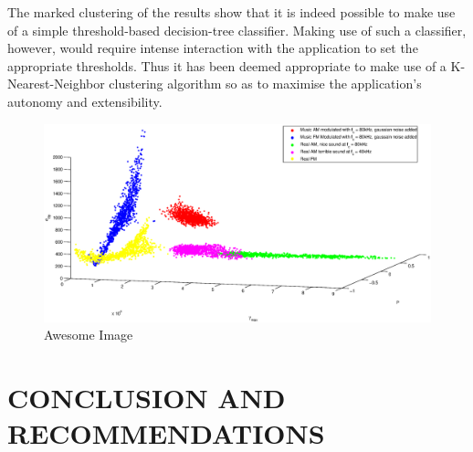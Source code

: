 \documentclass[10pt,twocolumn]{witseiepaper}
\begin{document}
	The marked clustering of the results show that it is indeed possible to make use of a simple threshold-based decision-tree classifier. Making use of such a classifier, however, would require intense interaction with the application to set the appropriate thresholds. Thus it has been deemed appropriate to make use of a K-Nearest-Neighbor clustering algorithm so as to maximise the application's autonomy and extensibility.

	\begin{figure}[!h]
		\centering
		\includegraphics[width=1.1\textwidth]{plot0.eps}
		\caption{Awesome Image}
		\label{fig:awesome_image}
	\end{figure}

\section{CONCLUSION AND RECOMMENDATIONS}



 
\end{document}
